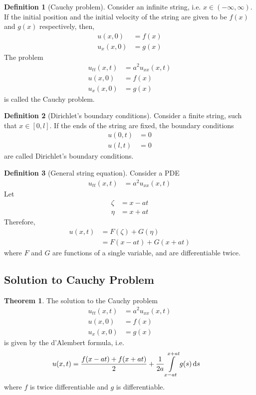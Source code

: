 \documentclass[titlepage, fleqn, a4paper, 12pt, twoside]{article}
\theoremstyle{definition}
\newtheorem{definition}{Definition}
\theoremstyle{theorem}
\newtheorem{theorem}{Theorem}
\begin{document}
\begin{definition}[Cauchy problem]
	Consider an infinite string, i.e. $x \in (-\infty,\infty)$.
	If the initial position and the initial velocity of the string are given to be $f(x)$ and $g(x)$ respectively, then,
	\begin{align*}
		u(x,0)   & = f(x) \\
		u_x(x,0) & = g(x)
	\end{align*}
	The problem
	\begin{align*}
		u_{t t}(x,t) & = a^2 u_{x x}(x,t) \\
		u(x,0)       & = f(x)             \\
		u_x(x,0)     & = g(x)
	\end{align*}
	is called the Cauchy problem.
\end{definition}

\begin{definition}[Dirichlet's boundary conditions]
	Consider a finite string, such that $x \in [0,l]$.
	If the ends of the string are fixed, the boundary conditions
	\begin{align*}
		u(0,t) & = 0 \\
		u(l,t) & = 0
	\end{align*}
	are called Dirichlet's boundary conditions.
\end{definition}

\begin{definition}[General string equation]
	Consider a PDE
	\begin{align*}
		u_{t t}(x,t) & = a^2 u_{x x}(x,t)
	\end{align*}
	Let
	\begin{align*}
		\zeta & = x - a t \\
		\eta  & = x + a t
	\end{align*}
	Therefore,
	\begin{align*}
		u(x,t) & = F(\zeta) + G(\eta) \\
                       & = F(x - a t) + G(x + a t)
	\end{align*}
	where $F$ and $G$ are functions of a single variable, and are differentiable twice.
\end{definition}

\subsection{Solution to Cauchy Problem}

\begin{theorem}
	The solution to the Cauchy problem
	\begin{align*}
		u_{t t}(x,t) & = a^2 u_{x x}(x,t) \\
		u(x,0)       & = f(x)             \\
		u_x(x,0)     & = g(x)
	\end{align*}
	is given by the d'Alembert formula, i.e.
	\begin{align*}
		u(x,t) & = \frac{f(x - a t) + f(x + a t)}{2} + \frac{1}{2 a} \int\limits_{x - a t}^{x + a t} g(s) \dif s
	\end{align*}
	where $f$ is twice differentiable and $g$ is differentiable.
\end{theorem}
\end{document}

